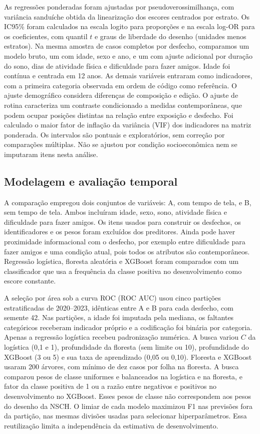 ﻿\documentclass[12pt]{article}
\begin{document}
As regressões ponderadas foram ajustadas por pseudoverossimilhança, com variância sanduíche obtida da linearização dos escores centrados por estrato. Os IC95\% foram calculados na escala logito para proporções e na escala log-OR para os coeficientes, com quantil $t$ e graus de liberdade do desenho (unidades menos estratos). Na mesma amostra de casos completos por desfecho, comparamos um modelo bruto, um com idade, sexo e ano, e um com ajuste adicional por duração do sono, dias de atividade física e dificuldade para fazer amigos. Idade foi contínua e centrada em 12 anos. As demais variáveis entraram como indicadores, com a primeira categoria observada em ordem de código como referência. O ajuste demográfico considera diferenças de composição e edição. O ajuste de rotina caracteriza um contraste condicionado a medidas contemporâneas, que podem ocupar posições distintas na relação entre exposição e desfecho. Foi calculado o maior fator de inflação da variância (VIF) dos indicadores na matriz ponderada. Os intervalos são pontuais e exploratórios, sem correção por comparações múltiplas. Não se ajustou por condição socioeconômica nem se imputaram itens nesta análise.

\subsection{Modelagem e avaliação temporal}

A comparação empregou dois conjuntos de variáveis: A, com tempo de tela, e B, sem tempo de tela. Ambos incluíram idade, sexo, sono, atividade física e dificuldade para fazer amigos. Os itens usados para construir os desfechos, os identificadores e os pesos foram excluídos dos preditores. Ainda pode haver proximidade informacional com o desfecho, por exemplo entre dificuldade para fazer amigos e uma condição atual, pois todos os atributos são contemporâneos. Regressão logística, floresta aleatória e XGBoost foram comparados com um classificador que usa a frequência da classe positiva no desenvolvimento como escore constante.

A seleção por área sob a curva ROC (ROC AUC) usou cinco partições estratificadas de 2020--2023, idênticas entre A e B para cada desfecho, com semente 42. Nas partições, a idade foi imputada pela mediana, os faltantes categóricos receberam indicador próprio e a codificação foi binária por categoria. Apenas a regressão logística recebeu padronização numérica. A busca variou $C$ da logística (0,1 e 1), profundidade da floresta (sem limite ou 10), profundidade do XGBoost (3 ou 5) e sua taxa de aprendizado (0,05 ou 0,10). Floresta e XGBoost usaram 200 árvores, com mínimo de dez casos por folha na floresta. A busca comparou pesos de classe uniformes e balanceados na logística e na floresta, e fator da classe positiva de 1 ou a razão entre negativos e positivos no desenvolvimento no XGBoost. Esses pesos de classe não correspondem aos pesos do desenho da NSCH. O limiar de cada modelo maximizou F1 nas previsões fora da partição, nas mesmas divisões usadas para selecionar hiperparâmetros. Essa reutilização limita a independência da estimativa de desenvolvimento.
\end{document}
